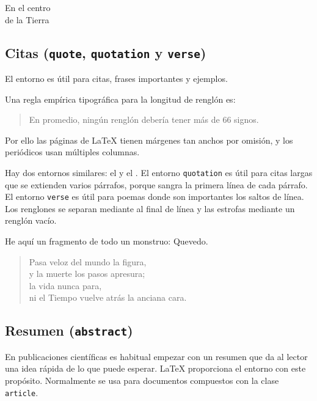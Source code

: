 \begin{example}
\begin{center}
En el centro\\de la Tierra
\end{center}
\end{example}

\subsection{Citas (\texttt{quote}, \texttt{quotation} y \texttt{verse})}

El entorno  es útil para citas, frases importantes y ejemplos.

\begin{example}
Una regla empírica tipográfica
para la longitud de renglón es:
\begin{quote}
En promedio, ningún renglón
debería tener más de 66 signos.
\end{quote}
Por ello las páginas de \LaTeX{} 
tienen márgenes tan anchos por 
omisión, y los periódicos usan
múltiples columnas.
\end{example}

Hay dos entornos similares: el  y el .  El entorno \texttt{quotation} es útil para citas largas que se extienden varios párrafos, porque sangra la primera línea de cada párrafo.  El entorno \texttt{verse} es útil para poemas donde son importantes los saltos de línea.  Los renglones se separan mediante \ci{\bs} al final de línea y las estrofas mediante un renglón vacío.


\begin{example}
He aquí un fragmento de
todo un monstruo: Quevedo.
\begin{flushleft}
\begin{verse}
Pasa veloz del mundo la 
figura,\\
y la muerte los pasos 
apresura;\\
la vida nunca para,\\
ni el Tiempo vuelve atrás la 
anciana cara.
\end{verse}
\end{flushleft}
\end{example}

\subsection{Resumen (\texttt{abstract})}

En publicaciones científicas es habitual empezar con un resumen que da al lector una idea rápida de lo que puede esperar. \LaTeX{} proporciona el entorno  con este propósito. Normalmente  se usa para documentos compuestos con la clase \texttt{article}.

